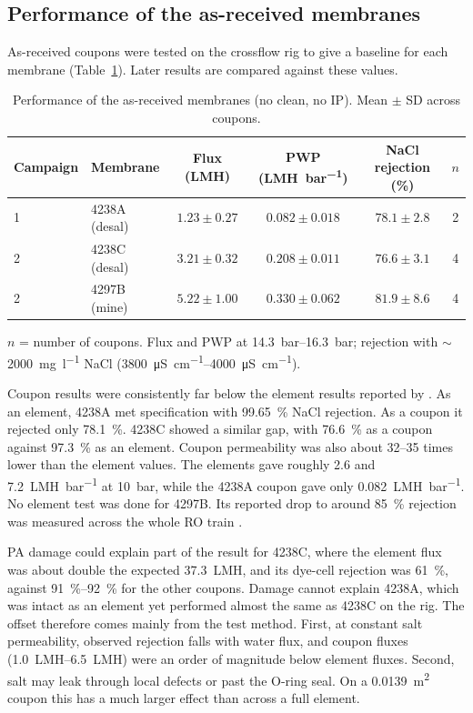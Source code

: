 \subsection{Performance of the as-received membranes}
\label{sec:res-baseline}
As-received coupons were tested on the crossflow rig to give a baseline for each membrane (Table~\ref{tab:baseline}). Later results are compared against these values.

  \begin{table}[htbp]
  \centering
  \caption{Performance of the as-received membranes (no clean, no IP). Mean $\pm$ SD across coupons.}
  \label{tab:baseline}
    \begin{tabular}{llcccc}
    \toprule
    Campaign & Membrane & Flux (\unit{LMH}) & PWP (\unit{LMH.bar^{-1}}) & NaCl rejection (\%) & $n$ \\
    \midrule
    1 & 4238A (desal) & $1.23 \pm 0.27$ & $0.082 \pm 0.018$ & $78.1 \pm 2.8$ & 2 \\
    2 & 4238C (desal) & $3.21 \pm 0.32$ & $0.208 \pm 0.011$ & $76.6 \pm 3.1$ & 4 \\
    2 & 4297B (mine)  & $5.22 \pm 1.00$ & $0.330 \pm 0.062$ & $81.9 \pm 8.6$ & 4 \\
    \bottomrule
  \end{tabular}
  \par\smallskip
  \footnotesize $n$ = number of coupons. Flux and PWP at \qtyrange{14.3}{16.3}{bar}; rejection with $\sim$\qty{2000}{\milli\gram\per\litre} NaCl (\qtyrange{3800}{4000}{\micro\siemens\per\centi\metre}).
  \end{table}

Coupon results were consistently far below the element results reported by \citet{MembraneWorks2025Desal}. As an element, 4238A met specification with \qty{99.65}{\percent} NaCl rejection. As a coupon it rejected only \qty{78.1}{\percent}. 4238C showed a similar gap, with \qty{76.6}{\percent} as a coupon against \qty{97.3}{\percent} as an element. Coupon permeability was also about 32--35 times lower than the element values. The elements gave roughly \qty{2.6}{} and \qty{7.2}{LMH.bar^{-1}} at \qty{10}{bar}, while the 4238A coupon gave only \qty{0.082}{LMH.bar^{-1}}. No element test was done for 4297B. Its reported drop to around \qty{85}{\percent} rejection was measured across the whole RO train \citep{MembraneWorks2026Mine}.

PA damage could explain part of the result for 4238C, where the element flux was about double the expected \qty{37.3}{LMH}, and its dye-cell rejection was \qty{61}{\percent}, against \qtyrange{91}{92}{\percent} for the other coupons. Damage cannot explain 4238A, which was intact as an element yet performed almost the same as 4238C on the rig. The offset therefore comes mainly from the test method. First, at constant salt permeability, observed rejection falls with water flux, and coupon fluxes (\qtyrange{1.0}{6.5}{LMH}) were an order of magnitude below element fluxes. Second, salt may leak through local defects or past the O-ring seal. On a \qty{0.0139}{\square\metre} coupon this has a much larger effect than across a full element.


